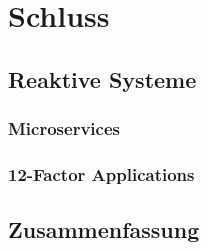 \chapter{Schluss}

\section{Reaktive Systeme}
\subsection{Microservices}
\subsection{12-Factor Applications}

\section{Zusammenfassung}
